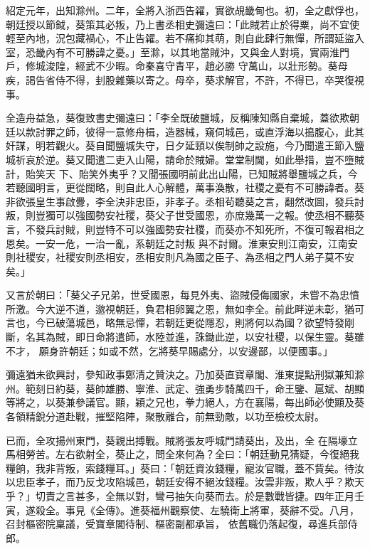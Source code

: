 \begin{pinyinscope}
 紹定元年，出知滁州。二年，全將入浙西告糴，實欲覘畿甸也。初，全之獻俘也，朝廷授以節鉞，葵策其必叛，乃上書丞相史彌遠曰：「此賊若止於得粟，尚不宜使輕至內地，況包藏禍心，不止告糴。若不痛抑其萌，則自此肆行無憚，所謂延盜入室，恐畿內有不可勝諱之憂。」至滁，以其地當賊沖，又與金人對境，實兩淮門戶，修城浚隍，經武不少暇。命秦喜守青平，趙必勝
 守萬山，以壯形勢。葵母疾，謁告省侍不得，刲股雜藥以寄之。母卒，葵求解官，不許，不得已，卒哭復視事。



 全造舟益急，葵復致書史彌遠曰：「李全既破鹽城，反稱陳知縣自棄城，蓋欲欺朝廷以款討罪之師，彼得一意修舟楫，造器械，窺伺城邑，或直浮海以搗腹心，此其奸謀，明若觀火。葵自聞鹽城失守，日夕延頸以俟制帥之設施，今乃聞遣王節入鹽城祈哀於逆。葵又聞遣二吏入山陽，請命於賊婦。堂堂制閫，如此舉措，豈不墮賊計，貽笑天
 下、貽笑外夷乎？又聞張國明前此出山陽，已知賊將舉鹽城之兵，今若聽國明言，更從闊略，則自此人心解體，萬事渙散，社稷之憂有不可勝諱者。葵非欲張皇生事啟釁，李全決非忠臣，非孝子。丞相茍聽葵之言，翻然改圖，發兵討叛，則豈獨可以強國勢安社稷，葵父子世受國恩，亦庶幾萬一之報。使丞相不聽葵言，不發兵討賊，則豈特不可以強國勢安社稷，而葵亦不知死所，不復可報君相之恩矣。一安一危，一治一亂，系朝廷之討叛
 與不討爾。淮東安則江南安，江南安則社稷安，社稷安則丞相安，丞相安則凡為國之臣子、為丞相之門人弟子莫不安矣。」



 又言於朝曰：「葵父子兄弟，世受國恩，每見外夷、盜賊侵侮國家，未嘗不為忠憤所激。今大逆不道，邈視朝廷，負君相卵翼之恩，無如李全。前此畔逆未彰，猶可言也，今已破蕩城邑，略無忌憚，若朝廷更從隱忍，則將何以為國？欲望特發剛斷，名其為賊，即日命將遣師，水陸並進，誅鋤此逆，以安社稷，以保生靈。葵雖不才，
 願身許朝廷；如或不然，乞將葵早賜處分，以安邊鄙，以便國事。」



 彌遠猶未欲興討，參知政事鄭清之贊決之。乃加葵直寶章閣、淮東提點刑獄兼知滁州。範刻日約葵，葵帥雄勝、寧淮、武定、強勇步騎萬四千，命王鑒、扈斌、胡顯等將之，以葵兼參議官。顯，穎之兄也，拳力絕人，方在襄陽，每出師必使顯及葵各領精銳分道赴戰，摧堅陷陣，聚散離合，前無勁敵，以功至檢校太尉。



 已而，全攻揚州東門，葵親出搏戰。賊將張友呼城門請葵出，及出，全
 在隔壕立馬相勞苦。左右欲射全，葵止之，問全來何為？全曰：「朝廷動見猜疑，今復絕我糧餉，我非背叛，索錢糧耳。」葵曰：「朝廷資汝錢糧，寵汝官職，蓋不貲矣。待汝以忠臣孝子，而乃反戈攻陷城邑，朝廷安得不絕汝錢糧。汝雲非叛，欺人乎？欺天乎？」切責之言甚多，全無以對，彎弓抽矢向葵而去。於是數戰皆捷。四年正月壬寅，遂殺全。事見《全傳》。進葵福州觀察使、左驍衛上將軍，葵辭不受。八月，召封樞密院稟議，受寶章閣待制、樞密副都承旨，
 依舊職仍落起復，尋進兵部侍郎。




\end{pinyinscope}
